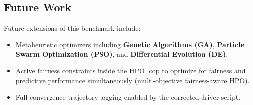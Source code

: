 \documentclass[11pt,a4paper]{article}
\begin{document}
\subsection{Future Work}
Future extensions of this benchmark include:
\begin{itemize}
    \item Metaheuristic optimizers including \textbf{Genetic Algorithms (GA)}, \textbf{Particle Swarm Optimization (PSO)}, and \textbf{Differential Evolution (DE)}.
    \item Active fairness constraints inside the HPO loop to optimize for fairness and predictive performance simultaneously (multi-objective fairness-aware HPO).
    \item Full convergence trajectory logging enabled by the corrected driver script.
\end{itemize}



\end{document}
